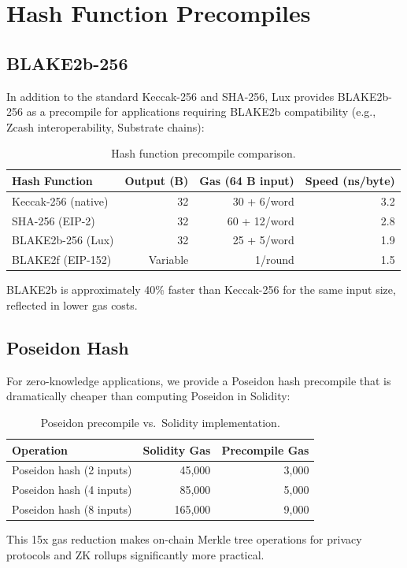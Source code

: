 \section{Hash Function Precompiles}
\label{sec:hash}

\subsection{BLAKE2b-256}

In addition to the standard Keccak-256 and SHA-256, Lux provides BLAKE2b-256 as a precompile for applications requiring BLAKE2b compatibility (e.g., Zcash interoperability, Substrate chains):

\begin{table}[H]
\centering
\caption{Hash function precompile comparison.}
\label{tab:hash}
\begin{tabular}{lrrr}
\toprule
\textbf{Hash Function} & \textbf{Output (B)} & \textbf{Gas (64 B input)} & \textbf{Speed (ns/byte)} \\
\midrule
Keccak-256 (native) & 32 & 30 + 6/word & 3.2 \\
SHA-256 (EIP-2) & 32 & 60 + 12/word & 2.8 \\
BLAKE2b-256 (Lux) & 32 & 25 + 5/word & 1.9 \\
BLAKE2f (EIP-152) & Variable & 1/round & 1.5 \\
\bottomrule
\end{tabular}
\end{table}

BLAKE2b is approximately 40\% faster than Keccak-256 for the same input size, reflected in lower gas costs.

\subsection{Poseidon Hash}

For zero-knowledge applications, we provide a Poseidon hash precompile that is dramatically cheaper than computing Poseidon in Solidity:

\begin{table}[H]
\centering
\caption{Poseidon precompile vs.\ Solidity implementation.}
\label{tab:poseidon}
\begin{tabular}{lrr}
\toprule
\textbf{Operation} & \textbf{Solidity Gas} & \textbf{Precompile Gas} \\
\midrule
Poseidon hash (2 inputs) & 45,000 & 3,000 \\
Poseidon hash (4 inputs) & 85,000 & 5,000 \\
Poseidon hash (8 inputs) & 165,000 & 9,000 \\
\bottomrule
\end{tabular}
\end{table}

This 15x gas reduction makes on-chain Merkle tree operations for privacy protocols and ZK rollups significantly more practical.

